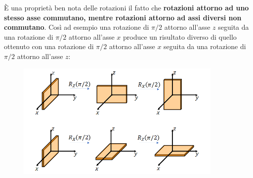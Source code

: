 È una proprietà ben nota delle rotazioni il fatto che \textbf{rotazioni attorno ad uno stesso asse commutano, mentre rotazioni attorno ad assi diversi non commutano}. Così ad esempio una rotazione di $\pi /2$ attorno all'asse $z$ seguita da una rotazione di $\pi /2$ attorno all'asse $x$ produce un risultato diverso di quello ottenuto con una rotazione di $\pi /2$ attorno all'asse $x$ seguita da una rotazione di $\pi /2$ attorno all'asse $z$:\\
\begin{figure}[!htbp]
\begin{center}
\includegraphics[width=10cm]{immagini/cap_16/fig_16_1.png}
\end{center}
\end{figure}


